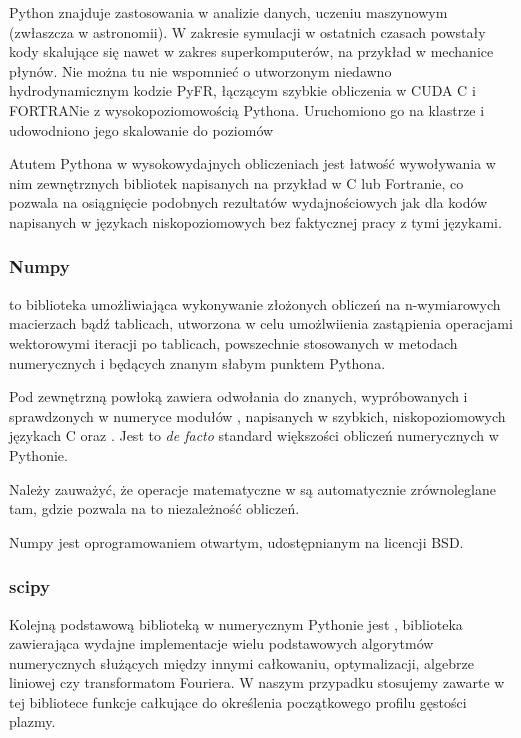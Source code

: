     Python znajduje zastosowania w analizie danych, uczeniu maszynowym
    (zwłaszcza w astronomii). W zakresie symulacji w ostatnich czasach powstały
    kody skalujące się nawet w zakres superkomputerów, na przykład w mechanice
    płynów.  Nie można tu nie wspomnieć o utworzonym niedawno hydrodynamicznym kodzie
    PyFR, łączącym szybkie obliczenia w CUDA C i FORTRANie 
    z wysokopoziomowością Pythona. Uruchomiono go na klastrze 
    i udowodniono jego skalowanie do poziomów 

    Atutem Pythona w wysokowydajnych obliczeniach jest łatwość wywoływania w
    nim zewnętrznych bibliotek napisanych na przykład w C lub Fortranie, co
    pozwala na osiągnięcie podobnych rezultatów wydajnościowych jak dla kodów
    napisanych w językach niskopoziomowych bez faktycznej pracy z tymi
    językami.



    \subsubsection{Numpy}
     to biblioteka umożliwiająca wykonywanie złożonych obliczeń na
    n-wymiarowych macierzach bądź tablicach, utworzona w celu umożlwiienia
    zastąpienia operacjami wektorowymi iteracji po tablicach, powszechnie
    stosowanych w metodach numerycznych i będących znanym słabym punktem
    Pythona.

    Pod zewnętrzną powłoką zawiera odwołania do znanych, wypróbowanych i
    sprawdzonych w numeryce modułów ,  napisanych w
    szybkich, niskopoziomowych językach C oraz .  Jest to
    \emph{de facto} standard większości obliczeń numerycznych w Pythonie.

    Należy zauważyć, że operacje matematyczne w  są automatycznie
    zrównoleglane  tam, gdzie pozwala na to
    niezależność obliczeń.

    Numpy jest oprogramowaniem otwartym, udostępnianym na licencji BSD.

    \subsubsection{scipy}
    Kolejną podstawową biblioteką w numerycznym Pythonie jest ,
    biblioteka zawierająca wydajne implementacje wielu podstawowych algorytmów
    numerycznych służących między innymi całkowaniu, optymalizacji, algebrze
    liniowej czy transformatom Fouriera.  W naszym przypadku stosujemy zawarte
    w tej bibliotece funkcje całkujące do określenia początkowego profilu
    gęstości plazmy.  

